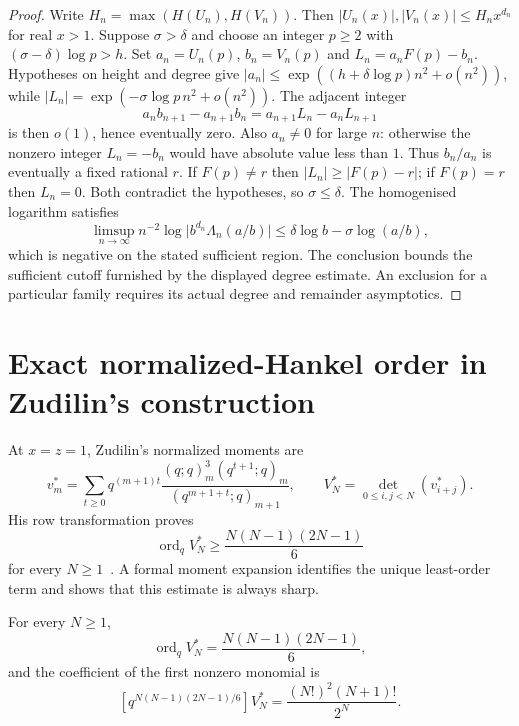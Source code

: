\documentclass[11pt]{article}
\begin{document}
\begin{proof}
Write $H_n=\max(H(U_n),H(V_n))$.  Then
$|U_n(x)|,|V_n(x)|\le H_n x^{d_n}$ for real $x>1$.
Suppose $\sigma>\delta$ and choose an integer $p\ge2$ with
$(\sigma-\delta)\log p>h$.  Set $a_n=U_n(p)$, $b_n=V_n(p)$ and
$L_n=a_n F(p)-b_n$.  Hypotheses on height and degree give
$|a_n|\le\exp((h+\delta\log p)n^2+o(n^2))$, while
$|L_n|=\exp(-\sigma\log p\,n^2+o(n^2))$.  The adjacent integer
\[
 a_nb_{n+1}-a_{n+1}b_n=a_{n+1}L_n-a_n L_{n+1}
\]
is then $o(1)$, hence eventually zero.  Also $a_n\ne0$ for large $n$:
otherwise the nonzero integer $L_n=-b_n$ would have absolute value less
than $1$.  Thus $b_n/a_n$ is eventually a fixed rational $r$.  If
$F(p)\ne r$ then $|L_n|\ge|F(p)-r|$; if $F(p)=r$ then $L_n=0$.  Both
contradict the hypotheses, so $\sigma\le\delta$.
The homogenised logarithm satisfies
\[
 \limsup_{n\to\infty} n^{-2}\log\bigl|b^{d_n}\Lambda_n(a/b)\bigr|
 \le \delta\log b-\sigma\log(a/b),
\]
which is negative on the stated sufficient region.  The conclusion bounds the
sufficient cutoff furnished by the displayed degree estimate.  An exclusion for a
particular family requires its actual degree and remainder asymptotics.
\end{proof}

\section{Exact normalized-Hankel order in Zudilin's construction}
\label{sec:hankel-order}

At $x=z=1$, Zudilin's normalized moments are
\[
 v_m^*=\sum_{t\ge0}q^{(m+1)t}
 \frac{(q;q)_m^3(q^{t+1};q)_m}{(q^{m+1+t};q)_{m+1}},
 \qquad
 V_N^*=\det_{0\le i,j<N}(v_{i+j}^*).
\]
His row transformation proves
\[
 \operatorname{ord}_q V_N^*\ge
 \frac{N(N-1)(2N-1)}6
\]
for every $N\ge1$~\cite[Section~4]{zudilin2016}.  A formal moment expansion identifies the unique least-order term and
shows that this estimate is always sharp.

\begin{theorem}
\label{res:zudilin-sharp-qorder}
For every $N\ge1$,
\[
 \operatorname{ord}_q V_N^*=\frac{N(N-1)(2N-1)}6,
\]
and the coefficient of the first nonzero monomial is
\[
 [q^{N(N-1)(2N-1)/6}]V_N^*
   =\frac{(N!)^2(N+1)!}{2^N}.
\]
\end{theorem}
\end{document}

